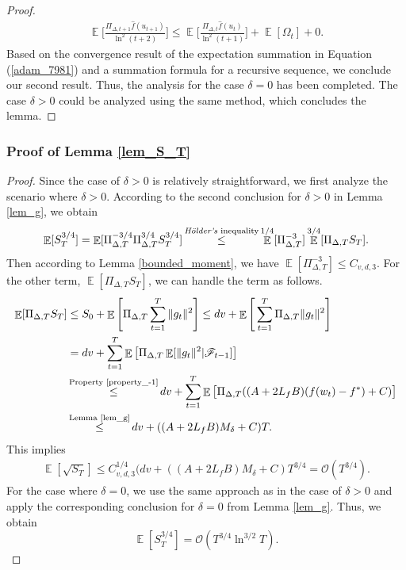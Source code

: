 \documentclass{article} %
\DeclareMathOperator{\Expect}{\mathbb{E}}
\begin{document}
\begin{proof}
\begin{align}\label{adam_7980''}
\Expect\Bigg[\frac{\Pi_{\Delta,t+1}\hat{f}(u_{t+1})}{\ln^{2}(t+2)}\Bigg]\le \Expect\Bigg[\frac{\Pi_{\Delta,t}\hat{f}(u_{t})}{\ln^{2}(t+1)}\Bigg]+\Expect[{\Omega_{t}}]+0.
\end{align}
Based on the convergence result of the expectation summation in Equation (\ref{adam_7981}) and a summation formula for a recursive sequence, we conclude our second result. Thus, the analysis for the case $\delta = 0$ has been completed. The case $\delta > 0$ could be analyzed using the same method, which concludes the lemma.
\end{proof}


\subsubsection{Proof of Lemma \ref{lem_S_T}}
\begin{proof}
Since the case of $\delta > 0$ is relatively straightforward, we first analyze the scenario where $\delta > 0$. According to the second conclusion for $\delta > 0$ in Lemma \ref{lem_g}, we obtain
\begin{align*}
\Expect[{S^{3/4}_{T}}]=\Expect[\Pi_{\Delta,T}^{-3/4}\Pi^{3/4}_{\Delta,T}S^{3/4}_{T}]\mathop{\le}^{\text{\emph{Hölder's} inequality}} \Expect^{1/4}[\Pi_{\Delta,T}^{-3}]\Expect^{3/4}[\Pi_{\Delta,T}S_{T}].
\end{align*}
Then according to Lemma \ref{bounded_moment}, we have $\Expect[\Pi_{\Delta,T}^{-3}] \leq C_{v,d,3}$. For the other term, $\Expect[\Pi_{\Delta,T} S_{T}]$, we can handle the term as follows.
\begin{align*}
 \Expect[\Pi_{\Delta,T} S_{T}]&\le S_{0}+\Expect\Bigg[\Pi_{\Delta,T}\sum_{t=1}^{T}\|g_{t}\|^{2}\Bigg] \le dv+ \Expect\Bigg[\sum_{t=1}^{T}\Pi_{\Delta,T}\|g_{t}\|^{2}\Bigg]  \\&=dv+ \sum_{t=1}^{T}\Expect\big[\Pi_{\Delta,T}\Expect[\|g_{t}\|^{2}|\mathscr{F}_{t-1}]\big]\\& \mathop{\le}^{\text{Property \ref{property_-1}}}dv+ \sum_{t=1}^{T}\Expect\big[\Pi_{\Delta,T}((A+2L_{f}B)(f(w_{t})-f^{*})+C)\big]\\&\mathop{\le}^{\text{Lemma \ref{lem_g}}}dv+((A+2L_{f}B)M_{\delta}+C)T.
\end{align*}
This implies 
\begin{align*}
\Expect[\sqrt{S_{T}}]\le {C^{1/4}_{v,d,3}}(dv+((A+2L_{f}B)M_{\delta}+C)T^{3/4}=\mathcal{O}({T^{3/4}}).
\end{align*}
For the case where $\delta = 0$, we use the same approach as in the case of $\delta > 0$ and apply the corresponding conclusion for $\delta = 0$ from Lemma \ref{lem_g}. Thus, we obtain
\[\Expect[{S^{3/4}_{T}}]=\mathcal{O}({T^{3/4}}\ln^{3/2} T). \tag*{\qedhere}\]
\end{proof}
\end{document}
